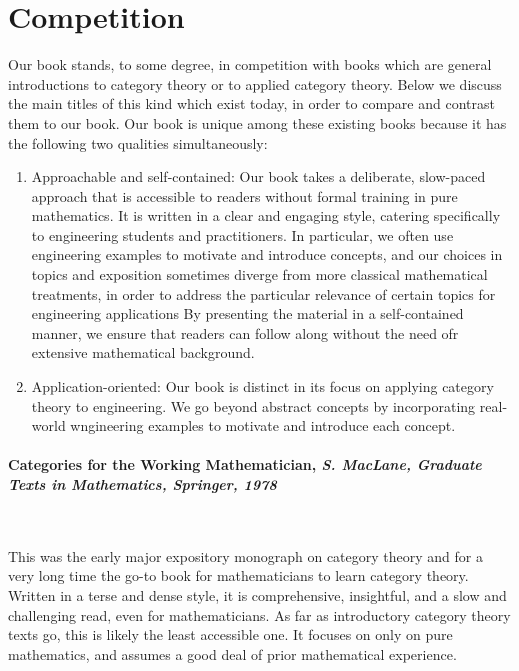 \documentclass[10pt, article, one side]{memoir}
\begin{document}
    \section{Competition}
    \label{sec:competition}

    Our book stands, to some degree, in competition with books which are general introductions to category theory or to applied category theory.
    Below we discuss the main titles of this kind which exist today, in order to compare and contrast them to our book.
    Our book is unique among these existing books because it has the following two qualities simultaneously:
    \begin{enumerate}
        \item Approachable and self-contained: Our book takes a deliberate, slow-paced approach that is accessible to readers without formal training in pure mathematics.
              It is written in a clear and engaging style, catering specifically to engineering students and practitioners.
              In particular, we often use engineering examples to motivate and introduce concepts, and our choices in topics and exposition sometimes diverge from more classical mathematical treatments, in order to address the particular relevance of certain topics for engineering applications
              By presenting the material in a self-contained manner, we ensure that readers can follow along without the need ofr extensive mathematical background.

        \item Application-oriented: Our book is distinct in its focus on applying category theory to engineering.
              We go beyond abstract concepts by incorporating real-world wngineering examples to motivate and introduce each concept.
    \end{enumerate}

    \paragraph{Categories for the Working Mathematician, \emph{S.
            MacLane, Graduate Texts in Mathematics, Springer, 1978}~\cite{mac2013categories}}
    \

    This was the early major expository monograph on category theory and for a very long time the go-to book for mathematicians to learn category theory.
    Written in a terse and dense style, it is comprehensive, insightful, and a slow and challenging read, even for mathematicians.
    As far as introductory category theory texts go, this is likely the least accessible one.
    It focuses on only on pure mathematics, and assumes a good deal of prior mathematical experience.
\end{document}
